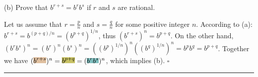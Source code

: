 \documentclass[10pt,varwidth=6in,margin=0.2in,preview]{standalone}
\newcommand{\highlightb}[1]{\setlength{\fboxsep}{0pt}\colorbox{brown!50}{$\displaystyle#1$}}
\newcommand{\highlightt}[1]{\setlength{\fboxsep}{0pt}\colorbox{teal!50}{$\displaystyle#1$}}
\newcommand{\highlighto}[1]{\setlength{\fboxsep}{0pt}\colorbox{olive!50}{$\displaystyle#1$}}
\begin{document}
\begin{flushleft}
\vspace{0.1in}

(b) Prove that ${b^{r+s}} = {b^r b^s}$ if $r$ and $s$ are rational.

\vspace{0.1in}

Let us assume that $r = \frac{p}{n}$ and $s = \frac{q}{n}$ for some positive integer $n$.
According to (a): $b^{r+s} = b^{(p+q)/n} = (b^{p+q})^{1/n}$, thus $({b^{r+s}})^n = {b^{p+q}}$.
On the other hand, $({b^r b^s})^n = (b^r)^n (b^s)^n = \left( (b^p)^{1/n} \right)^n \left( (b^q)^{1/n} \right)^n = b^p b^q = {b^{p+q}}$.
Together we have $(\highlightb{b^{r+s}})^n = \highlighto{b^{p+q}} = (\highlightt{b^r b^s})^n$, which implies (b). $\square$


\vspace{4in}

\hrule

\end{flushleft}
\end{document}
